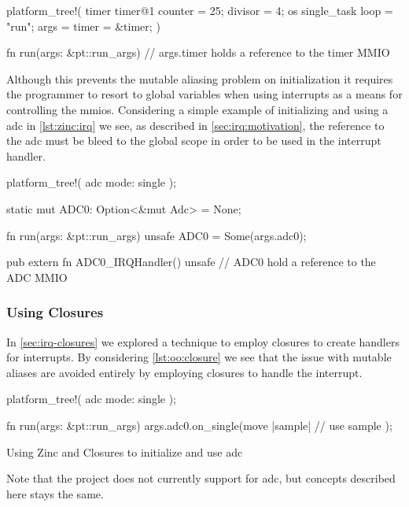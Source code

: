 \begin{listing}[H]
  \begin{rustcode}
platform_tree!(
  timer { timer@1 { counter = 25; divisor = 4; } }
  os { single_task { loop = "run"; args = { timer = &timer; } } }
)

fn run(args: &pt::run_args) {
  // args.timer holds a reference to the timer MMIO
}
  \end{rustcode}
  \caption{}
  \label{lst:zinc:platformtree}
\end{listing}

Although this prevents the mutable aliasing problem on initialization it requires the programmer to resort to global variables when using interrupts as a means for controlling the \glspl{mmio}.
Considering a simple example of initializing and using a \gls{adc} in \autoref{lst:zinc:irq} we see, as described in \autoref{sec:irq:motivation}, the reference to the \gls{adc} must be bleed to the global scope in order to be used in the interrupt handler.

\begin{listing}[H]
  \begin{rustcode}
platform_tree!(
  adc { mode: single }
);

static mut ADC0: Option<&mut Adc> = None;

fn run(args: &pt::run_args) {
  unsafe { ADC0 = Some(args.adc0); }
}

pub extern fn ADC0_IRQHandler() {
  unsafe {
    // ADC0 hold a reference to the ADC MMIO
  }
}
  \end{rustcode}
  \caption{}
  \label{lst:zinc:irq}
\end{listing}

\subsubsection{Using Closures}

In \autoref{sec:irq-closures} we explored a technique to employ closures to create handlers for interrupts.
By considering \autoref{lst:oo:closure} we see that the issue with mutable aliases are avoided entirely by employing closures to handle the interrupt.

\begin{listing}[H]
  \begin{rustcode}
platform_tree!(
  adc { mode: single }
);

fn run(args: &pt::run_args) {
  args.adc0.on_single(move |sample| {
    // use sample
  });
}
  \end{rustcode}
  \caption{Using Zinc and Closures to initialize and use \gls{adc}}
  \label{lst:oo:closure}
\end{listing}

Note that the  project does not currently support for \gls{adc}, but concepts described here stays the same.
